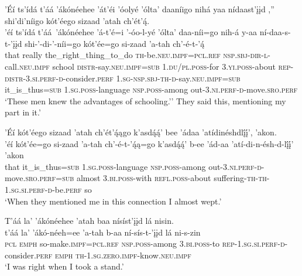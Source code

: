 \ea\label{ex:text3-10-6}
’Éí ts’ídá t’áá ’ákónéehee ’át’éi ’óolyé ’ólta’ daaníigo nihá yaa nídaast’įįd ,'' shi’di’níigo kót’éego sizaad ’atah ch’ét’ą́.\\
\gll ’éí	ts’ídá	t’áá~{’ákónéehee}	’á-t’é=i	’-óo-l-yé	’ólta’	daa-níi=go	nih-á	y-aa	ní-daa-s-t-’įįd	shi-’-di-’-níi=go	kót’ée=go	si-zaad	’a-tah	ch’-é-t-’ą́\\
     that	really	the\_right\_thing\_to\_do	\textsc{th}-be.\textsc{neu}.\textsc{impf}=\textsc{pcl}.\textsc{ref}	\textsc{nsp}.\textsc{sbj}-\textsc{dir}-\textsc{l}-call.\textsc{neu}.\textsc{impf}	school	\textsc{distr}-say.\textsc{neu}.\textsc{impf}=\textsc{sub}	1.\textsc{du}/\textsc{pl}.\textsc{poss}-for	3.\textsc{yi}.\textsc{poss}-about	\textsc{rep}-\textsc{distr}-3.\textsc{si}.\textsc{perf}-\textsc{d}-consider.\textsc{perf}	1.\textsc{sg}-\textsc{nsp}.\textsc{sbj}-\textsc{th}-\textsc{d}-say.\textsc{neu}.\textsc{impf}=\textsc{sub}	it\_is\_thus=\textsc{sub}	1.\textsc{sg}.\textsc{poss}-language	\textsc{nsp}.\textsc{poss}-among	out-3.\textsc{ni}.\textsc{perf}-\textsc{d}-move.\textsc{sro}.\textsc{perf}\\
\glt `These men knew the advantages of schooling.'' They said this, mentioning my part in it.'
\z

\ea\label{ex:text3-10-7}
’Éí kót’éego sizaad ’atah ch’ét’ą́ągo k’asdą́ą́’ bee ’ádaa ’atídinéshdlį́į́’, ’akon.\\
\gll ’éí	kót’ée=go	si-zaad	’a-tah	ch’-é-t-’ą́ą=go	k’asdą́ą́’	b-ee	’ád-aa	’atí-di-n-ésh-d-lį́į́’	’akon\\
     that	it\_is\_thus=\textsc{sub}	1.\textsc{sg}.\textsc{poss}-language	\textsc{nsp}.\textsc{poss}-among	out-3.\textsc{ni}.\textsc{perf}-\textsc{d}-move.\textsc{sro}.\textsc{perf}=\textsc{sub}	almost	3.\textsc{bi}.\textsc{poss}-with	\textsc{refl}.\textsc{poss}-about	suffering-\textsc{th}-\textsc{th}-1.\textsc{sg}.\textsc{si}.\textsc{perf}-\textsc{d}-be.\textsc{perf}	so\\
\glt `When they mentioned me in this connection I almost wept.'
\z

\ea\label{ex:text3-10-8}
T’áá la’ ’ákónéehee ’atah baa nísíst’įįd lá nisin.\\
\gll t’áá	la’	’ákó-néeh=ee	’a-tah	b-aa	ní-sís-t-’įįd	lá	ni-s-zin\\
     \textsc{pcl}	\textsc{emph}	so-make.\textsc{impf}=\textsc{pcl}.\textsc{ref}	\textsc{nsp}.\textsc{poss}-among	3.\textsc{bi}.\textsc{poss}-to	\textsc{rep}-1.\textsc{sg}.\textsc{si}.\textsc{perf}-\textsc{d}-consider.\textsc{perf}	\textsc{emph}	\textsc{th}-1.\textsc{sg}.\textsc{zero}.\textsc{impf}-know.\textsc{neu}.\textsc{impf}\\
\glt `I was right when I took a stand.'
\z

